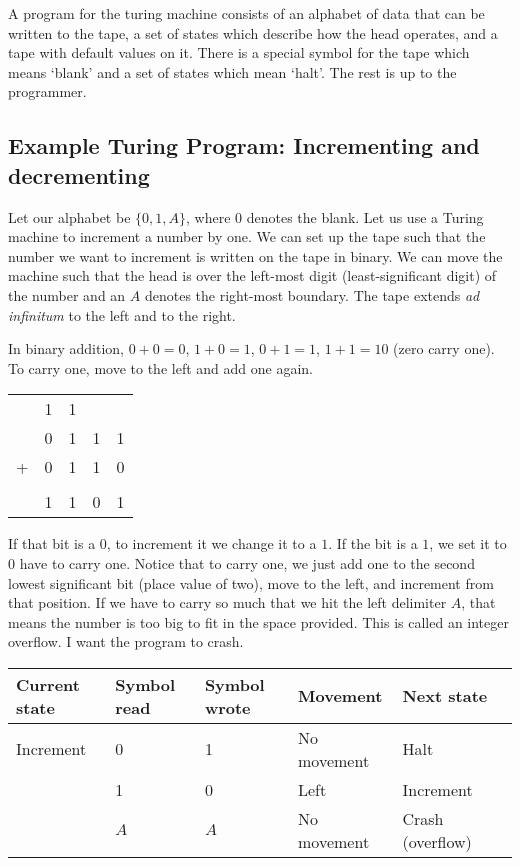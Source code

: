 \documentclass[11pt, letterpaper, twoside, openright]{book}
\begin{document}
A program for the turing machine consists of an alphabet of data that can be written to the tape, a set of states which describe how the head operates, and a tape with default values on it. There is a special symbol for the tape which means `blank' and a set of states which mean `halt'. The rest is up to the programmer.

\subsection{Example Turing Program: Incrementing and decrementing}
Let our alphabet be $\{0, 1, A\}$, where $0$ denotes the blank. Let us use a Turing machine to increment a number by one. We can set up the tape such that the number we want to increment is written on the tape in binary. We can move the machine such that the head is over the left-most digit (least-significant digit) of the number and an $A$ denotes the right-most boundary. The tape extends \textit{ad infinitum} to the left and to the right.

In binary addition, $0 + 0 = 0$, $1 + 0 = 1$, $0 + 1 = 1$, $1 + 1 = 10$ (zero carry one). To carry one, move to the left and add one again.

\begin{tabular}{lllll}
&1&1& & \\
&0&1&1&1 \\
+&0&1&1&0 \\
\hline \\
&1&1&0&1 \\
\end{tabular}

If that bit is a $0$, to increment it we change it to a $1$. If the bit is a $1$, we set it to $0$ have to carry one. Notice that to carry one, we just add one to the second lowest significant bit (place value of two), move to the left, and increment from that position. If we have to carry so much that we hit the left delimiter $A$, that means the number is too big to fit in the space provided. This is called an integer overflow. I want the program to crash.

\begin{tabular}{|l|l|l|l|l|l|}
\hline
Current state & Symbol read & Symbol wrote & Movement & Next state \\
\hline
Increment & 0 & 1 & No movement & Halt \\
 & 1 & 0 & Left & Increment \\
 & $A$ & $A$ & No movement & Crash (overflow) \\
\hline
\end{tabular}
\end{document}
